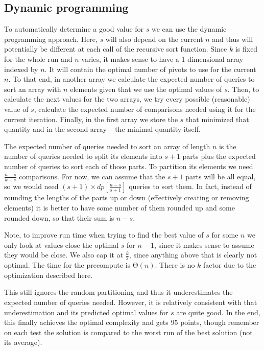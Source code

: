 \documentclass{article}
\begin{document}
\subsection{Dynamic programming}

To automatically determine a good value for $ s $ we can use the dynamic programming approach. Here, $ s $ will also depend on the current $ n $ and thus will potentially be different at each call of the recursive sort function. Since $ k $ is fixed for the whole run and $ n $ varies, it makes sense to have a 1-dimensional array indexed by $ n $. It will contain the optimal number of pivots to use for the current $ n $. To that end, in another array we calculate the expected number of queries to sort an array with $ n $ elements given that we use the optimal values of $ s $. Then, to calculate the next values for the two arrays, we try every possible (reasonable) value of $ s $, calculate the expected number of comparisons needed using it for the current iteration. Finally, in the first array we store the $ s $ that minimized that quantity and in the second array -- the minimal quantity itself.

The expected number of queries needed to sort an array of length $ n $ is the number of queries needed to split its elements into $ s + 1 $ parts plus the expected number of queries to sort each of those parts. To partition its elements we need $ \frac{n - s}{k - s} $ comparisons. For now, we can assume that the $ s + 1 $ parts will be all equal, so we would need $ (s + 1) \times dp\left[ \frac{n - s}{s + 1} \right] $ queries to sort them. In fact, instead of rounding the lengths of the parts up or down (effectively creating or removing elements) it is better to have some number of them rounded up and some rounded down, so that their sum is $ n - s $.

Note, to improve run time when trying to find the best value of $ s $ for some $ n $ we only look at values close the optimal $ s $ for $ n - 1 $, since it makes sense to assume they would be close. We also cap it at $ \frac{k}{2} $, since anything above that is clearly not optimal. The time for the precompute is $ \mathrm{\Theta}\left( n \right) $. There is no $ k $ factor due to the optimization described here.

This still ignores the random partitioning and thus it underestimates the expected number of queries needed. However, it is relatively consistent with that underestimation and its predicted optimal values for $ s $ are quite good. In the end, this finally achieves the optimal complexity and gets 95 points, though remember on each test the solution is compared to the worst run of the best solution (not its average).
\end{document}
